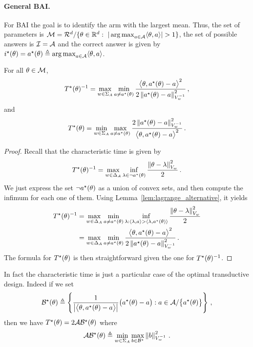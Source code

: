 \paragraph{General BAI.}\label{sec:lgc.formulation.examples.general}
For BAI the goal is to identify the arm with the largest mean. Thus, the set of parameters is $\cM=\cR^d/\{\theta\in\R^d:\  |\argmax_{a\in\cA} \langle\theta,a\rangle|>1\}$, the set of possible answers is $\mathcal{I} = \mathcal{A}$ and the correct answer is given by $i^\star(\theta)=a^\star(\theta)\triangleq \operatorname*{arg\,max}_{a\in\mathcal{A}} \langle\theta,a\rangle$.
\begin{lemma}
\label{lem:complexity_bai}
For all $\theta\in \mathcal{M}$,
\[
T^{\star}(\theta)^{-1} = \max_{w\in\Sigma_A} \min_{a\neq a^\star(\theta)} \frac{\big\langle \theta, a^\star(\theta)-a\big\rangle^2}{2 \left\lVert a^\star(\theta)-a\right\rVert_{V_w^{-1}}^2}\,,
\]
and
\[
T^{\star}(\theta) = \min_{w\in\Sigma_A} \max_{a\neq a^\star(\theta)} \frac{2\left\lVert a^\star(\theta)-a\right\rVert_{V_w^{-1}}^2}{\big\langle \theta, a^\star(\theta)-a\big\rangle^2}\,.
\]
\end{lemma}
\begin{proof}
Recall that the characteristic time is given by
\[
T^{\star}(\theta)^{-1} = \max_{w \in \Delta_A} \inf_{\lambda\in \neg a^\star(\theta)} \frac{\left\lVert\theta - \lambda\right\rVert_{V_w}^2}{2}\,.
\]
We just express the set $\neg a^\star(\theta)$ as a union of convex sets, and then compute the infimum for each one of them. Using Lemma~\ref{lem:lagrange_alternative}, it yields
\begin{align*}
  T^{\star}(\theta)^{-1} &= \max_{w \in \Delta_A} \min_{a \neq a^\star(\theta)} \inf_{\lambda: \langle\lambda,a\rangle > \langle\lambda,a^\star(\theta)\rangle} \frac{\left\lVert\theta - \lambda\right\rVert_{V_w}^2}{2}\\
  &= \max_{w \in \Delta_A} \min_{a \neq a^\star(\theta)} \frac{\big\langle \theta, a^\star(\theta)-a\big\rangle^2}{2 \left\lVert a^\star(\theta)-a\right\rVert_{V_w^{-1}}^2}\,.
\end{align*}
The formula for $T^{\star}(\theta)$ is then straightforward given the one for  $T^{\star}(\theta)^{-1}$.

\end{proof}
In fact the characteristic time is just a particular case of the optimal transductive design. Indeed if we set
\[
\mathcal{B}^\star(\theta) \triangleq \left\{ \frac{1}{\left|\big\langle \theta, a^\star(\theta)-a\big\rangle\right|}\big(a^\star(\theta)- a\big): a\in\mathcal{A}/\big\{a^\star(\theta)\big\}  \right\}\,,
\]
then we have $T^{\star}(\theta) = 2 \mathcal{A}\mathcal{B}^\star(\theta)$ where
\[
\mathcal{A}\mathcal{B}^\star(\theta) \triangleq  \min_{w\in\Sigma_A} \max_{b\in \mathcal{B}^\star} \left\lVert b\right\rVert_{V_w^{-1}}^2\,.
\]


